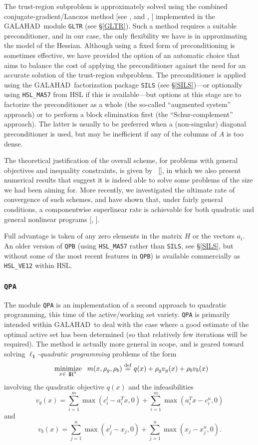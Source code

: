 \documentclass[acmtocl,acmnow]{acmtrans2m}
\newcommand{\minin}[1]{ {\renewcommand{\arraystretch}{0.8} 
                     \begin{array}[t]{c} 
                     \mbox{minimize} \vspace*{-1mm} \\ 
                     \mbox{ $\scriptstyle #1 $ } 
                     \end{array} \;} }
\newcommand{\eqdef}{\stackrel{\rm def}{=}}
\newcommand{\gal}{{\sf GALAHAD}}
\newcommand{\ltsubsubsection}[1]{\subsubsection{{\tt #1}} \label{#1}}
\newcommand{\citebb}[1]{\citeauthor{#1}\ [\citeyear{#1}]}
\newcommand{\bciteb}[1]{\citeauthor{#1}, \citeyear{#1}}
\newcommand{\eqn}[2]{\begin{equation}\label{#1}{#2}\end{equation}}
\newcommand{\disp}[1]{\[{#1}\]}
\newcommand{\smallRe}
     {\mbox{\raisebox{-0.8pt}{\footnotesize I\hskip -1.5pt R\hskip -0.5pt}}}
\begin{document}
The trust-region subproblem is approximately solved using the 
combined conjugate-gradient/Lan\-czos method [see \bciteb{GoulHribNoce98} and
\bciteb{GoulLuciRomaToin99:siopt}] implemented in the \gal\ module {\tt GLTR}
(see \S\ref{GLTR}).
Such a method requires a suitable preconditioner,
and in our case, the only flexibility we have is in approximating the
model of the Hessian. Although using a fixed form of preconditioning is
sometimes effective, we have provided the option of an automatic choice
that aims to balance the cost of applying the preconditioner against
the need for an accurate solution of the trust-region subproblem. 
The preconditioner is applied using the \gal\ factorization package
{\tt SILS} (see \S\ref{SILS})---or optionally using {\tt HSL\_MA57} 
from HSL if this is available---but options at this stage are
to factorize the preconditioner as a whole (the so-called ``augmented system''
approach) or to perform a block elimination first (the ``Schur-complement''
approach). The latter is usually to be preferred when a (non-singular) diagonal 
preconditioner is used, but may be inefficient if any of the columns
of $A$ is too dense.

The theoretical justification of the
overall scheme, for problems with general objectives and 
inequality constraints, 
is given by \citebb{ConnGoulOrbaToin00:mp}, in which we also present
numerical results that suggest it is indeed able to solve 
some problems of the size we had been aiming for. 
More recently, we investigated the ultimate rate of convergence
of such schemes, and have shown that, under fairly general conditions, 
a componentwise superlinear rate is achievable for both quadratic and general 
nonlinear programs [\bciteb{GoulOrbaSartToin01}].

Full advantage is taken of any zero elements in the matrix $H$ or the
vectors $a_{i}$.
An older version of {\tt QPB} (using {\tt HSL\_MA57} rather than {\tt SILS},
see \S\ref{SILS}, but without some of the most recent features in {\tt QPB})
is available commercially as {\tt HSL\_VE12} within HSL.

\ltsubsubsection{QPA}

The module {\tt QPA} is an implementation of a second approach
to quadratic programming, this time of the active/working set variety.
{\tt QPA} is primarily intended within \gal\ to deal with the case 
where a good
estimate of the optimal active set has been determined (so that
relatively few iterations will be required). The method is actually more
general in scope, and is geared toward solving
{\em $\mathbf{\ell_1}$-quadratic programming} problems of the form
\eqn{1.1}{\minin{x \in \smallRe^n} m(x, \rho_g, \rho_b ) \eqdef
q(x) + \rho_g v_g(x) + \rho_b v_b(x)}
involving the quadratic objective $q(x)$ and the infeasibilities
\disp{v_g(x) = 
   \sum_{i=1}^{m} \max ( c_{i}^{l} - a_i^T x, 0 )
 + \sum_{i=1}^{m} \max ( a_i^T x - c_{i}^{u}, 0 )}
and
\disp{v_b(x) = 
   \sum_{j=1}^{n} \max ( x_{j}^{l} - x_{j}  , 0 )
 + \sum_{j=1}^{n} \max ( x_{j}  - x_{j}^{u} , 0 ) .}
\end{document}
